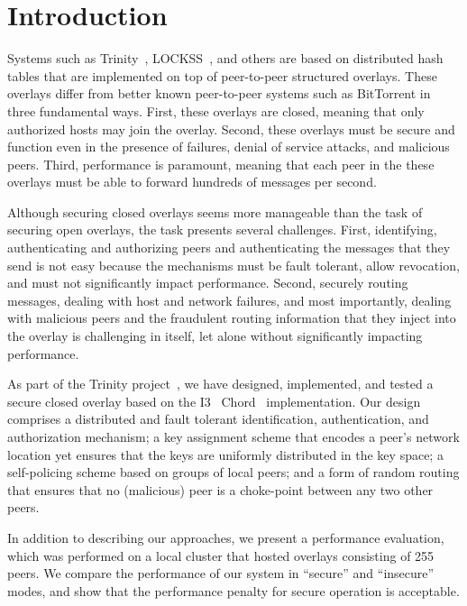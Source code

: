 \documentclass[11pt]{article}
\begin{document}
\thispagestyle{empty}

\newpage
\setcounter{page}{1}

\section{Introduction}
Systems such as Trinity~\cite{BrBr07}, LOCKSS~\cite{MaRoRoBaGiMu03},
and others are based on distributed hash tables that are implemented
on top of peer-to-peer structured overlays.  These overlays differ
from better known peer-to-peer systems such as BitTorrent in three
fundamental ways.   First, these overlays are closed, meaning that
only authorized hosts may join the overlay.  Second, these overlays
must be secure and function even in the presence of failures, denial
of service attacks, and malicious peers.  Third, performance is
paramount, meaning that each peer in the these overlays must be able
to forward hundreds of messages per second.

Although securing closed overlays seems more manageable than the
task of securing open overlays, the task presents several challenges.
First, identifying, authenticating and authorizing peers and
authenticating the messages that they send is not easy because the
mechanisms must be fault tolerant, allow revocation, and must not
significantly impact performance.  Second, securely routing messages, 
dealing with host and network failures, and most importantly, dealing 
with malicious peers and the fraudulent routing information that they 
inject into the overlay is challenging in itself, let alone without
significantly impacting performance.

As part of the Trinity project~\cite{BrBr07}, we have designed,
implemented, and tested a secure closed overlay based on the
I3~\cite{StAdZhShSu04} Chord~\cite{StMoKaKaBa01} implementation.
Our design comprises a distributed and fault tolerant identification, 
authentication, and authorization mechanism; a key assignment scheme 
that encodes a peer's network location yet ensures that the keys are
uniformly distributed in the key space; a self-policing scheme based 
on groups of local peers; and a form of random routing that ensures 
that no (malicious) peer is a choke-point between any two other peers.

In addition to describing our approaches, we present a performance
evaluation, which was performed on a local cluster that hosted
overlays consisting of 255 peers.  We compare the performance of
our system in ``secure'' and ``insecure'' modes, and show that the
performance penalty for secure operation is acceptable.  
\end{document}
